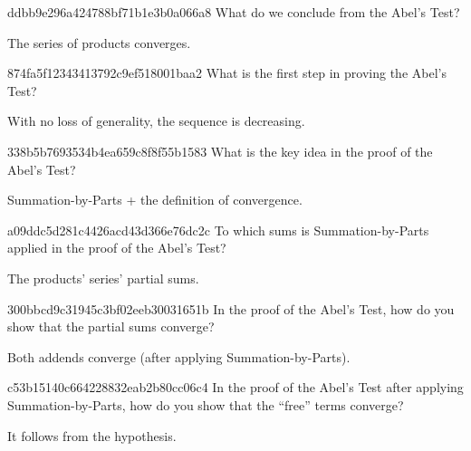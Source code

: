\begin{note}{ddbb9e296a424788bf71b1e3b0a066a8}
    What do we conclude from the Abel's Test?

    \begin{cloze}{1}
        The series of products converges.
    \end{cloze}
\end{note}

\begin{note}{874fa5f12343413792c9ef518001baa2}
    What is the first step in proving the Abel's Test?

    \begin{cloze}{1}
        With no loss of generality, the sequence is decreasing.
    \end{cloze}
\end{note}

\begin{note}{338b5b7693534b4ea659c8f8f55b1583}
    What is the key idea in the proof of the Abel's Test?

    \begin{cloze}{1}
        Summation-by-Parts + the definition of convergence.
    \end{cloze}
\end{note}

\begin{note}{a09ddc5d281c4426acd43d366e76dc2c}
    To which sums is Summation-by-Parts applied in the proof of the Abel's Test?

    \begin{cloze}{1}
        The products' series' partial sums.
    \end{cloze}
\end{note}

\begin{note}{300bbcd9c31945c3bf02eeb30031651b}
    In the proof of the Abel's Test, how do you show that the partial sums converge?

    \begin{cloze}{1}
        Both addends converge (after applying Summation-by-Parts).
    \end{cloze}
\end{note}

\begin{note}{c53b15140c664228832eab2b80cc06c4}
    In the proof of the Abel's Test after applying Summation-by-Parts, how do you show that the ``free'' terms converge?

    \begin{cloze}{1}
        It follows from the hypothesis.
    \end{cloze}
\end{note}

